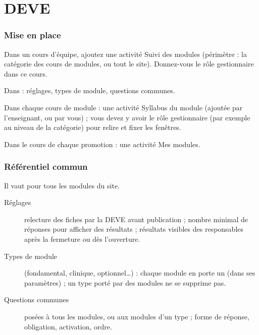 \documentclass[11pt,a4paper]{article}
\begin{document}
\newpage
\part{DEVE}\label{part:deve}

\section{Mise en place}

\begin{etapes}
  \item Dans un cours d'équipe, ajoutez une activité \og Suivi des modules\fg{} (périmètre :
    la catégorie des cours de modules, ou tout le site). Donnez-vous le rôle
    \og gestionnaire\fg{} dans ce cours.
  \item Dans  : réglages, types de module, questions communes.
  \item Dans chaque cours de module : une activité \og Syllabus du module\fg{} (ajoutée par
    l'enseignant, ou par vous) ; vous devez y avoir le rôle \og gestionnaire\fg{} (par exemple
    au niveau de la catégorie) pour relire et fixer les fenêtres.
  \item Dans le cours de chaque promotion : une activité \og Mes modules\fg{}.
\end{etapes}

\section{Référentiel commun}

Il vaut pour tous les modules du site.
\begin{description}
  \item[Réglages] relecture des fiches par la DEVE avant publication ; nombre minimal de
    réponses pour afficher des résultats ; résultats visibles des responsables après la
    fermeture ou dès l'ouverture.
  \item[Types de module] (fondamental, clinique, optionnel\dots) : chaque module en porte un
    (dans ses paramètres) ; un type porté par des modules ne se supprime pas.
  \item[Questions communes] posées à tous les modules, ou aux modules d'un type ; forme de
    réponse, obligation, activation, ordre.
\end{description}
\end{document}
